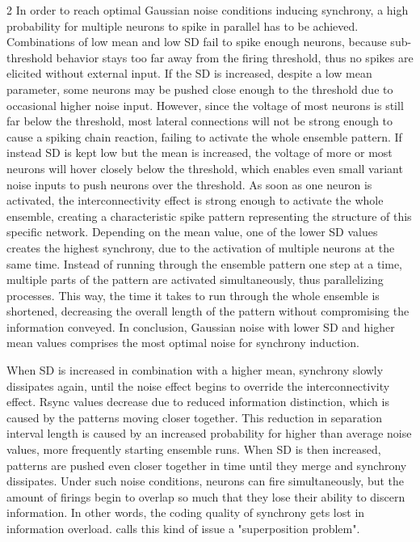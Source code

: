 \documentclass[12pt,a4paper]{article}
\begin{document}
\begin{multicols}{2}
            In order to reach optimal Gaussian noise conditions inducing synchrony, a high probability for multiple neurons to spike in parallel has to be achieved. Combinations of low mean and low SD fail to spike enough neurons, because sub-threshold behavior stays too far away from the firing threshold, thus no spikes are elicited without external input. If the SD is increased, despite a low mean parameter, some neurons may be pushed close enough to the threshold due to occasional higher noise input. However, since the voltage of most neurons is still far below the threshold, most lateral connections will not be strong enough to cause a spiking chain reaction, failing to activate the whole ensemble pattern. If instead SD is kept low but the mean is increased, the voltage of more or most neurons will hover closely below the threshold, which enables even small variant noise inputs to push neurons over the threshold. As soon as one neuron is activated, the interconnectivity effect is strong enough to activate the whole ensemble, creating a characteristic spike pattern representing the structure of this specific network. Depending on the mean value, one of the lower SD values creates the highest synchrony, due to the activation of multiple neurons at the same time. Instead of running through the ensemble pattern one step at a time, multiple parts of the pattern are activated simultaneously, thus parallelizing processes. This way, the time it takes to run through the whole ensemble is shortened, decreasing the overall length of the pattern without compromising the information conveyed. In conclusion, Gaussian noise with lower SD and higher mean values comprises the most optimal noise for synchrony induction.
            
            When SD is increased in combination with a higher mean, synchrony slowly dissipates again, until the noise effect begins to override the interconnectivity effect. Rsync values decrease due to reduced information distinction, which is caused by the patterns moving closer together. This reduction in separation interval length is caused by an increased probability for higher than average noise values, more frequently starting ensemble runs. When SD is then increased, patterns are pushed even closer together in time until they merge and synchrony dissipates. Under such noise conditions, neurons can fire simultaneously, but the amount of firings begin to overlap so much that they lose their ability to discern information. In other words, the coding quality of synchrony gets lost in information overload. \textcite[p. 55]{G} calls this kind of issue a "superposition problem".


\end{multicols}
\end{document}
